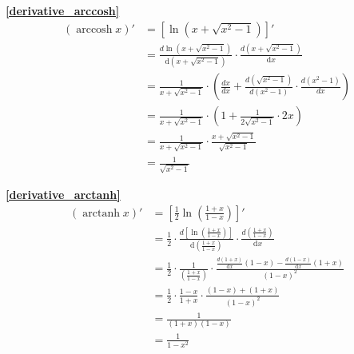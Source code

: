 \textbf{\large \ref{derivative_arccosh}}
\begin{displaymath}
    \begin{split}
        (\operatorname{arccosh}{x})' &=\left[\ln(x+\sqrt{x^2-1})\right]'\\
                                    &=\frac{d \ln(x+\sqrt{x^2-1})}{\mathrm{d}{\left(x+\sqrt{x^2-1}\right)}}\cdot\frac{d \left(x+\sqrt{x^2-1}\right)}{\mathrm{d}{x}}\\
                                    &=\frac{1}{x+\sqrt{x^2-1}}\cdot\left(\frac{dx}{dx}+\frac{d \left(\sqrt{x^2-1}\right)}{d\left(x^2-1\right)}\cdot\frac{d(x^2-1)}{dx}\right)\\
                                    &=\frac{1}{x+\sqrt{x^2-1}}\cdot\left(1+\frac{1}{2\sqrt{x^2-1}}\cdot 2x\right)\\                                    
                                    &=\frac{1}{x+\sqrt{x^2-1}}\cdot\frac{x+\sqrt{x^2-1}}{\sqrt{x^2-1}}\\
                                    &=\frac{1}{\sqrt{x^2-1}}
                                \end{split}
\end{displaymath}

\textbf{\large \ref{derivative_arctanh}}
\begin{displaymath}
    \begin{split}
        (\operatorname{arctanh}{x})' &=\left[\frac{1}{2}\ln(\frac{1+x}{1-x})\right]'\\
        &=\frac{1}{2}\cdot\frac{d\left[\ln(\frac{1+x}{1-x})\right]}{\mathrm{d}{\left(\frac{1+x}{1-x}\right)}}\cdot\frac{d\left(\frac{1+x}{1-x}\right)}{\mathrm{d}{x}}\\
        &=\frac{1}{2}\cdot\frac{1}{\left(\frac{1+x}{1-x}\right)}\cdot\frac{\frac{d(1+x)}{\mathrm{d}{x}}(1-x)-\frac{d(1-x)}{\mathrm{d}{x}}(1+x)}{(1-x)^2}\\
        &=\frac{1}{2}\cdot\frac{1-x}{1+x}\cdot\frac{(1-x)+(1+x)}{(1-x)^2}\\
        &=\frac{1}{(1+x)(1-x)}\\
        &=\frac{1}{1-x^2}
    \end{split}
\end{displaymath}

